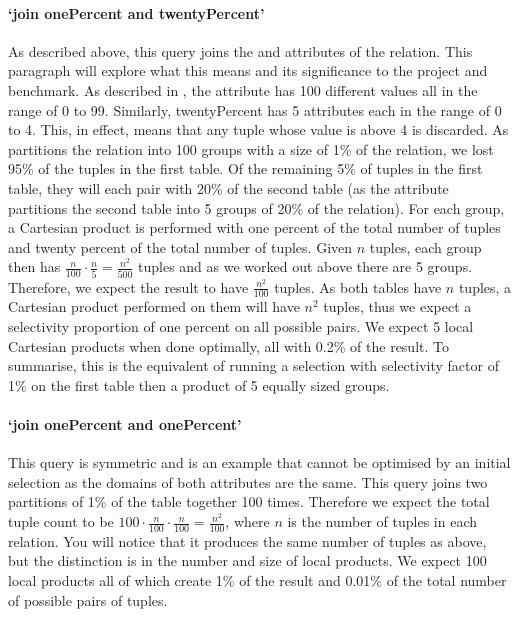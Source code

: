 \paragraph{`join onePercent and twentyPercent'} As described above, this query
joins the  and 
attributes of the  relation. This paragraph will explore
what this means and its significance to the project and benchmark. As described
in , the attribute 
has 100 different values all in the range of 0 to 99. Similarly, twentyPercent
has 5 attributes each in the range of 0 to 4. This, in effect, means that any
tuple whose  value is above 4 is discarded. As
 partitions the relation into 100 groups with a
size of 1\% of the relation, we lost 95\% of the tuples in the first table. Of
the remaining 5\% of tuples in the first table, they will each pair with 20\% of
the second table (as the attribute  partitions
the second table into 5 groups of 20\% of the relation). For each group, a
Cartesian product is performed with one percent of the total number of tuples
and twenty percent of the total number of tuples. Given $n$ tuples, each group
then has $\frac{n}{100} \cdot \frac{n}{5} = \frac{n^2}{500}$ tuples and as we
worked out above there are 5 groups. Therefore, we expect the result to have
$\frac{n^2}{100}$ tuples. As both tables have $n$ tuples, a Cartesian product
performed on them will have $n^2$ tuples, thus we expect a selectivity
proportion of one percent on all possible pairs. We expect 5 local Cartesian
products when done optimally, all with 0.2\% of the result. To summarise, this
is the equivalent of running a selection with selectivity factor of 1\% on the
first table then a product of 5 equally sized groups.

\paragraph{`join onePercent and onePercent'} This query is symmetric and is an
example that cannot be optimised by an initial selection as the domains of both
attributes are the same. This query joins two partitions of 1\% of the table
together 100 times. Therefore we expect the total tuple count to be $100 \cdot
\frac{n}{100} \cdot \frac{n}{100} = \frac{n^2}{100}$, where $n$ is the number of
tuples in each relation. You will notice that it produces the same number of
tuples as above, but the distinction is in the number and size of local products.
We expect 100 local products all of which create 1\% of the result and 0.01\% of
the total number of possible pairs of tuples.

